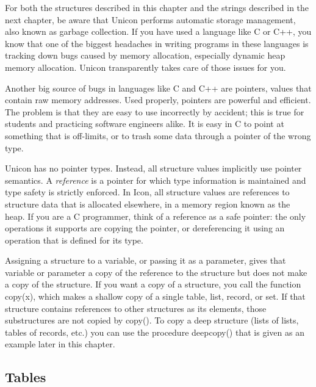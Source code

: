 For both the structures described in this chapter and the strings
described in the next chapter, be aware that Unicon performs
automatic storage management, also
known as garbage collection. If you have used
a language like C or C++, you know that one of the biggest headaches in
writing programs in these languages is tracking down bugs caused by
memory allocation, especially dynamic heap
memory allocation. Unicon transparently takes care of those issues for
you.

Another big source of bugs in languages like C and C++ are
pointers, values that contain raw memory addresses. Used properly, pointers are powerful and
efficient. The problem is that they are easy to use incorrectly by
accident; this is true for students and practicing software engineers
alike. It is easy in C to point at something that is off-limits, or to
trash some data through a pointer of the wrong type.

Unicon has no pointer types. Instead, all structure values implicitly
use pointer semantics. A \textit{reference} is a
pointer for which type information is maintained and type safety is
strictly enforced. In Icon, all structure values are references to
structure data that is allocated elsewhere, in a memory region known as
the heap. If you are a C programmer, think of a reference as a safe
pointer: the only operations it supports are copying the pointer, or
dereferencing it using an operation that is defined for its type.

Assigning a structure to a variable, or passing it as a
parameter, gives that variable or parameter a copy of
the reference to the structure but does not make a copy of the
structure. If you want a copy of a structure, you call the function
\textsf{copy(x)}, which makes a {\textquotedbl}shallow{\textquotedbl}
copy of a single table, list, record, or set. If that structure
contains references to other structures as its elements, those
substructures are not copied by \textsf{copy()}. To copy a
{\textquotedbl}deep{\textquotedbl} structure (lists of lists, tables of
records, etc.) you can use the procedure \textsf{deepcopy()} that is
given as an example later in this chapter.

\subsection{Tables}

